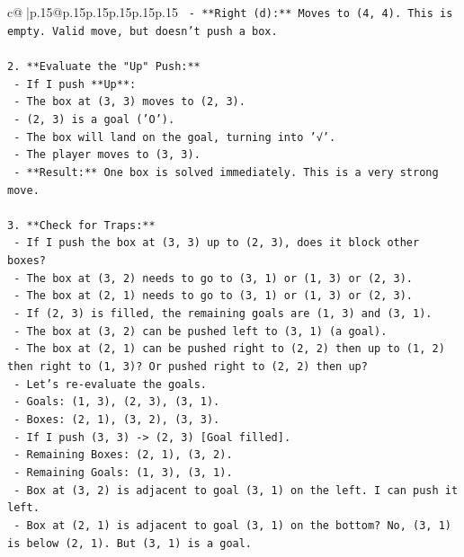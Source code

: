 \documentclass{article}
\begin{document}
{\begin{supertabular}{c@{$\;$}|p{.15\linewidth}@{}p{.15\linewidth}p{.15\linewidth}p{.15\linewidth}p{.15\linewidth}p{.15\linewidth}}
{{{\texttt{    {-} **Right (d):** Moves to (4, 4). This is empty. Valid move, but doesn't push a box.} \\
\\ 
\texttt{2.  **Evaluate the "Up" Push:**} \\
\texttt{    {-} If I push **Up**:} \\
\texttt{        {-} The box at (3, 3) moves to (2, 3).} \\
\texttt{        {-} (2, 3) is a goal ('O').} \\
\texttt{        {-} The box will land on the goal, turning into '√'.} \\
\texttt{        {-} The player moves to (3, 3).} \\
\texttt{    {-} **Result:** One box is solved immediately. This is a very strong move.} \\
\\ 
\texttt{3.  **Check for Traps:**} \\
\texttt{    {-} If I push the box at (3, 3) up to (2, 3), does it block other boxes?} \\
\texttt{        {-} The box at (3, 2) needs to go to (3, 1) or (1, 3) or (2, 3).} \\
\texttt{        {-} The box at (2, 1) needs to go to (3, 1) or (1, 3) or (2, 3).} \\
\texttt{        {-} If (2, 3) is filled, the remaining goals are (1, 3) and (3, 1).} \\
\texttt{        {-} The box at (3, 2) can be pushed left to (3, 1) (a goal).} \\
\texttt{        {-} The box at (2, 1) can be pushed right to (2, 2) then up to (1, 2) then right to (1, 3)? Or pushed right to (2, 2) then up?} \\
\texttt{        {-} Let's re{-}evaluate the goals.} \\
\texttt{        {-} Goals: (1, 3), (2, 3), (3, 1).} \\
\texttt{        {-} Boxes: (2, 1), (3, 2), (3, 3).} \\
\texttt{        {-} If I push (3, 3) {-}> (2, 3) {[}Goal filled{]}.} \\
\texttt{        {-} Remaining Boxes: (2, 1), (3, 2).} \\
\texttt{        {-} Remaining Goals: (1, 3), (3, 1).} \\
\texttt{        {-} Box at (3, 2) is adjacent to goal (3, 1) on the left. I can push it left.} \\
\texttt{        {-} Box at (2, 1) is adjacent to goal (3, 1) on the bottom? No, (3, 1) is below (2, 1). But (3, 1) is a goal.} \\
}}}
\end{supertabular}}
\end{document}
